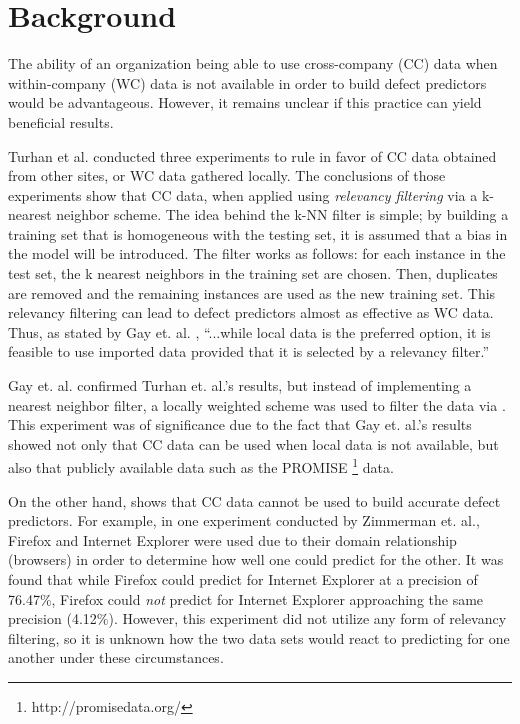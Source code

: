 \documentclass{sig-alternate}
\begin{document}
\section{Background}

The ability of an organization being able to use cross-company (CC) data
when within-company (WC) data is not available in order to build
defect predictors would be advantageous. However, it remains unclear
if this practice can yield beneficial results.

Turhan et al. conducted three experiments to rule in favor of CC data obtained from other sites, or WC data gathered locally. The conclusions of those experiments show that CC data, when applied using {\em relevancy filtering} via a k-nearest neighbor scheme. The idea behind the k-NN filter is simple; by building a training set that is homogeneous with the testing set, it is assumed that a bias in the model will be introduced. The filter works as follows: for each instance in the test set, the k nearest neighbors in the training set are chosen. Then, duplicates are removed and the remaining instances are used as the new training set. This relevancy filtering can lead to defect predictors almost as effective as WC data. Thus, as stated by Gay et. al. \cite{gay09}, ``...while local data is the preferred option, it is feasible to use imported data provided that it is selected by a relevancy filter.''

Gay et. al. confirmed Turhan et. al.'s results, but instead of implementing a nearest neighbor filter, a locally weighted scheme was used to filter the data via \cite{hallLWL}. This experiment was of significance due to the fact that Gay et. al.'s results showed not only that CC data can be used when local data is not available, but also that publicly available data such as the PROMISE \footnote{http://promisedata.org/} data.

On the other hand, \cite{zimmerman09} shows that CC data cannot be used to build accurate defect predictors. For example, in one experiment conducted by Zimmerman et. al., Firefox and Internet Explorer were used due to their domain relationship (browsers) in order to determine how well one could predict for the other. It was found that while Firefox could predict for Internet Explorer at a precision of 76.47\%, Firefox could {\em not} predict for Internet Explorer approaching the same precision (4.12\%). However, this experiment did not utilize any form of relevancy filtering, so it is unknown how the two data sets would react to predicting for one another under these circumstances.
\end{document}

